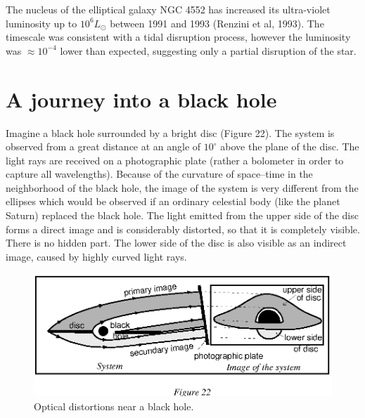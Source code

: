\documentclass[12pt]{article}
\begin{document}
The nucleus of the elliptical galaxy NGC 
4552 has increased its ultra-violet luminosity up to $10^{6} 
L_{\odot}$ between 1991 and 1993 (Renzini et al, 1993). The timescale 
was consistent with a tidal disruption process, however the luminosity 
was $\approx 10^{-4}$ lower than expected, suggesting only a partial disruption 
of the star.

\section {A journey into a black hole}

Imagine a black hole surrounded by a bright disc (Figure 22). The 
system is observed  from a great distance at an angle of $10^{\circ}$ 
above the plane of the disc. The light rays are received on a 
photographic plate (rather a bolometer in order to capture all 
wavelengths). Because of the curvature of space--time in the 
neighborhood of the black hole, the image of the system is very 
different from the ellipses which would be observed if an ordinary 
celestial body (like the planet Saturn) replaced the black hole. The 
light emitted from the upper side of the disc forms a direct image and 
is considerably distorted, so that it is completely visible. There is 
no hidden part. The lower side of the disc is also visible as an 
indirect image, caused by highly curved light rays. 
\begin{figure}[tb]
  \begin{center}
    \leavevmode
        \includegraphics{image.ps}
        \caption{Optical distortions near a black hole.}
  \end{center}
\end{figure}
\end{document}
